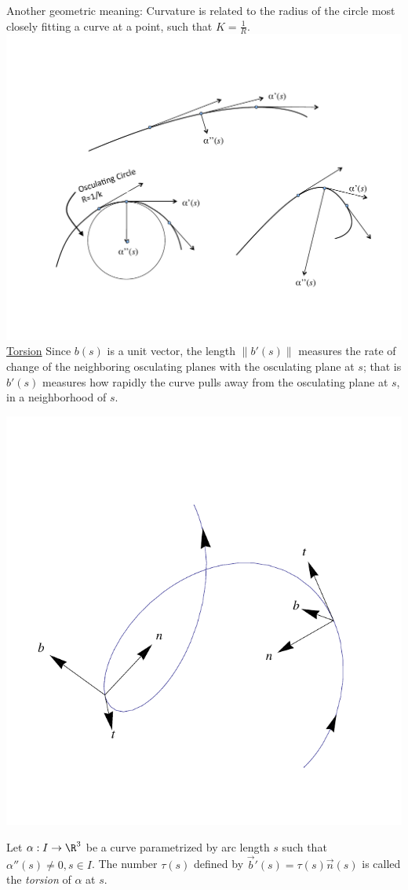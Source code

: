 \documentclass{article}
\begin{document}
Another geometric meaning: Curvature is related to the radius of the circle most closely fitting a curve at a point, such that $K =\frac{1}{R}.$ \\
\includegraphics[scale=.4]{curvature.pdf}\\
\underline{Torsion}
Since $b(s)$ is a unit vector, the length $\|b'(s)\|$ measures the rate of change of the neighboring
osculating planes with the osculating plane at $s$; that is $b'(s)$ measures how rapidly the curve
pulls away from the osculating plane at $s$, in a neighborhood of $s$. \\
\begin{center} \includegraphics[scale=0.6]{torsion.pdf} \end{center}
Let $\alpha : I \to \R^3$ be a curve parametrized by arc length $s$ such that $\alpha''(s) \ne 0,
s \in I$. The number $\tau(s)$ defined by $\vec{b}'(s) = \tau(s) \vec{n}(s)$ is called the
\emph{torsion} of $\alpha$ at $s$.
\end{document}
